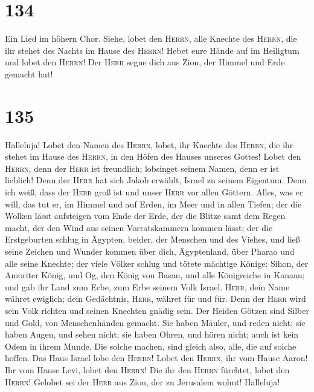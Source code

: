 \hypertarget{section-133}{%
\section{134}\label{section-133}}

 Ein Lied im höhern Chor. Siehe, lobet den \textsc{Herrn},
alle Knechte des \textsc{Herrn}, die ihr stehet des Nachts im Hause des
\textsc{Herrn}!  Hebet eure Hände auf im Heiligtum und
lobet den \textsc{Herrn}!  Der \textsc{Herr} segne dich
aus Zion, der Himmel und Erde gemacht hat!

\hypertarget{section-134}{%
\section{135}\label{section-134}}

 Halleluja! Lobet den Namen des \textsc{Herrn}, lobet, ihr
Knechte des \textsc{Herrn},  die ihr stehet im Hause des
\textsc{Herrn}, in den Höfen des Hauses unseres Gottes! 
Lobet den \textsc{Herrn}, denn der \textsc{Herr} ist freundlich;
lobsinget seinem Namen, denn er ist lieblich!  Denn der
\textsc{Herr} hat sich Jakob erwählt, Israel zu seinem Eigentum.
 Denn ich weiß, dass der \textsc{Herr} groß ist und unser
\textsc{Herr} vor allen Göttern.  Alles, was er will, das
tut er, im Himmel und auf Erden, im Meer und in allen Tiefen;
 der die Wolken lässt aufsteigen vom Ende der Erde, der
die Blitze samt dem Regen macht, der den Wind aus seinen Vorratskammern
kommen lässt;  der die Erstgeburten schlug in Ägypten,
beider, der Menschen und des Viehes,  und ließ seine
Zeichen und Wunder kommen über dich, Ägyptenland, über Pharao und alle
seine Knechte;  der viele Völker schlug und tötete
mächtige Könige:  Sihon, der Amoriter König, und Og, den
König von Basan, und alle Königreiche in Kanaan;  und gab
ihr Land zum Erbe, zum Erbe seinem Volk Israel. 
\textsc{Herr}, dein Name währet ewiglich; dein Gedächtnis,
\textsc{Herr}, währet für und für.  Denn der
\textsc{Herr} wird sein Volk richten und seinen Knechten gnädig sein.
 Der Heiden Götzen sind Silber und Gold, von
Menschenhänden gemacht.  Sie haben Mäuler, und reden
nicht; sie haben Augen, und sehen nicht;  sie haben
Ohren, und hören nicht; auch ist kein Odem in ihrem Munde.
 Die solche machen, sind gleich also, alle, die auf
solche hoffen.  Das Haus Israel lobe den \textsc{Herrn}!
Lobet den \textsc{Herrn}, ihr vom Hause Aaron!  Ihr vom
Hause Levi, lobet den \textsc{Herrn}! Die ihr den \textsc{Herrn}
fürchtet, lobet den \textsc{Herrn}!  Gelobet sei der
\textsc{Herr} aus Zion, der zu Jerusalem wohnt! Halleluja!

